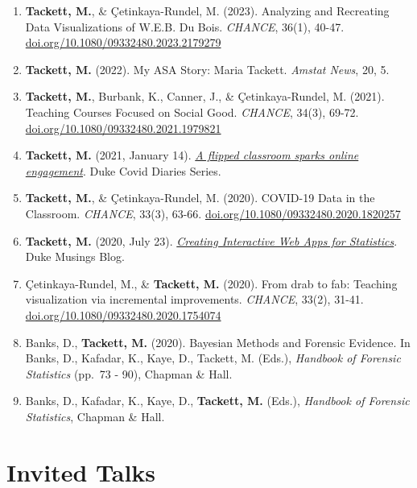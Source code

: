 \documentclass[11pt,dvipsnames]{article}
\begin{document}
\begin{enumerate}
\def\labelenumi{\arabic{enumi}.}
\setcounter{enumi}{11}
\item
  \textbf{Tackett, M.}, \& Çetinkaya-Rundel, M. (2023). Analyzing and
  Recreating Data Visualizations of W.E.B. Du Bois. \emph{CHANCE},
  36(1), 40-47.
  \href{https://doi.org/10.1080/09332480.2023.2179279}{doi.org/10.1080/09332480.2023.2179279}
\item
  \textbf{Tackett, M.} (2022). My ASA Story: Maria Tackett. \emph{Amstat
  News}, 20, 5.
\item
  \textbf{Tackett, M.}, Burbank, K., Canner, J., \& Çetinkaya-Rundel, M.
  (2021). Teaching Courses Focused on Social Good. \emph{CHANCE}, 34(3),
  69-72.
  \href{https://doi.org/10.1080/09332480.2021.1979821}{doi.org/10.1080/09332480.2021.1979821}
\item
  \textbf{Tackett, M.} (2021, January 14).
  \href{https://medium.com/dukeuniversity/a-flipped-classroom-sparks-online-student-engagement-7d6d8bce9694}{\emph{A
  flipped classroom sparks online engagement}}. Duke Covid Diaries
  Series.
\item
  \textbf{Tackett, M.}, \& Çetinkaya-Rundel, M. (2020). COVID-19 Data in
  the Classroom. \emph{CHANCE}, 33(3), 63-66.
  \href{https://doi.org/10.1080/09332480.2020.1820257}{doi.org/10.1080/09332480.2020.1820257}
\item
  \textbf{Tackett, M.} (2020, July 23).
  \href{https://muser.duke.edu/blog/creating-interactive-web-apps-statistics}{\emph{Creating
  Interactive Web Apps for Statistics}}. Duke Musings Blog.
\item
  Çetinkaya-Rundel, M., \& \textbf{Tackett, M.} (2020). From drab to
  fab: Teaching visualization via incremental improvements.
  \emph{CHANCE}, 33(2), 31-41.
  \href{https://doi.org/10.1080/09332480.2020.1754074}{doi.org/10.1080/09332480.2020.1754074}
\item
  Banks, D., \textbf{Tackett, M.} (2020). Bayesian Methods and Forensic
  Evidence. In Banks, D., Kafadar, K., Kaye, D., Tackett, M. (Eds.),
  \emph{Handbook of Forensic Statistics} (pp.~73 - 90), Chapman \& Hall.
\item
  Banks, D., Kafadar, K., Kaye, D., \textbf{Tackett, M.} (Eds.),
  \emph{Handbook of Forensic Statistics}, Chapman \& Hall.
\end{enumerate}

\hypertarget{invited-talks}{%
\section{Invited Talks}\label{invited-talks}}
\end{document}
